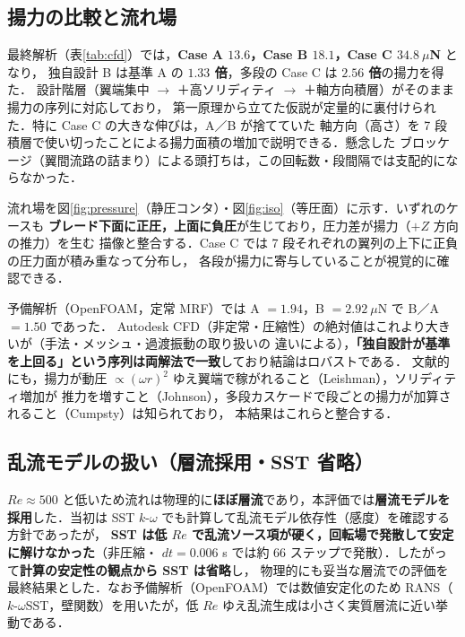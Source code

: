 \documentclass[a4paper,11pt]{jsarticle}
\begin{document}
\subsection{揚力の比較と流れ場}

最終解析（表\ref{tab:cfd}）では，\textbf{Case A $13.6$，Case B $18.1$，Case C $34.8\ \mu$N} となり，
独自設計 B は基準 A の \textbf{$1.33$ 倍}，多段の Case C は \textbf{$2.56$ 倍}の揚力を得た．
設計階層（翼端集中 $\to$ ＋高ソリディティ $\to$ ＋軸方向積層）がそのまま揚力の序列に対応しており，
第一原理から立てた仮説が定量的に裏付けられた．特に Case C の大きな伸びは，A／B が捨てていた
軸方向（高さ）を 7 段積層で使い切ったことによる揚力面積の増加で説明できる．懸念した
ブロッケージ（翼間流路の詰まり）による頭打ちは，この回転数・段間隔では支配的にならなかった．

流れ場を図\ref{fig:pressure}（静圧コンタ）・図\ref{fig:iso}（等圧面）に示す．いずれのケースも
\textbf{ブレード下面に正圧，上面に負圧}が生じており，圧力差が揚力（$+Z$ 方向の推力）を生む
描像と整合する．Case C では 7 段それぞれの翼列の上下に正負の圧力面が積み重なって分布し，
各段が揚力に寄与していることが視覚的に確認できる．

予備解析（OpenFOAM，定常 MRF）では A $=1.94$，B $=2.92\ \mu$N で B／A $=1.50$ であった．
Autodesk CFD（非定常・圧縮性）の絶対値はこれより大きいが（手法・メッシュ・過渡振動の取り扱いの
違いによる），\textbf{「独自設計が基準を上回る」という序列は両解法で一致}しており結論はロバストである．
文献的にも，揚力が動圧 $\propto(\omega r)^2$ ゆえ翼端で稼がれること（Leishman），ソリディティ増加が
推力を増すこと（Johnson），多段カスケードで段ごとの揚力が加算されること（Cumpsty）は知られており，
本結果はこれらと整合する．

\subsection{乱流モデルの扱い（層流採用・SST 省略）}

$Re\approx500$ と低いため流れは物理的に\textbf{ほぼ層流}であり，本評価では\textbf{層流モデルを
採用}した．当初は SST $k\text{-}\omega$ でも計算して乱流モデル依存性（感度）を確認する方針であったが，
\textbf{SST は低 $Re$ で乱流ソース項が硬く，回転場で発散して安定に解けなかった}（非圧縮・
$dt=0.006$ s では約 $66$ ステップで発散）．したがって\textbf{計算の安定性の観点から SST は省略}し，
物理的にも妥当な層流での評価を最終結果とした．なお予備解析（OpenFOAM）では数値安定化のため
RANS（$k$-$\omega$SST，壁関数）を用いたが，低 $Re$ ゆえ乱流生成は小さく実質層流に近い挙動である．
\end{document}

